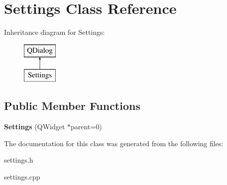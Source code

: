 \hypertarget{class_settings}{\section{Settings Class Reference}
\label{class_settings}
}
Inheritance diagram for Settings\+:\begin{figure}[H]
\begin{center}
\leavevmode
\includegraphics[height=2.000000cm]{class_settings}
\end{center}
\end{figure}
\subsection*{Public Member Functions}
\begin{DoxyCompactItemize}
\item 
\hypertarget{class_settings_ab17afd334db0af5f71c027b8eda8d514}{{\bfseries Settings} (Q\+Widget $\ast$parent=0)}\label{class_settings_ab17afd334db0af5f71c027b8eda8d514}

\end{DoxyCompactItemize}


The documentation for this class was generated from the following files\+:\begin{DoxyCompactItemize}
\item 
settings.\+h\item 
settings.\+cpp\end{DoxyCompactItemize}
